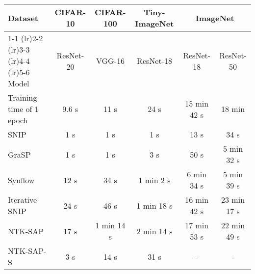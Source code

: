 \begin{table*}[h!]
    \begin{center}
    \caption{Pruning time of considered methods compared to time for 1 epoch of training.}     \label{tab:prune-time}
    \resizebox{1\linewidth}{!}
    {
    \begin{tabular}{ l ccccc}
    \\
    \hline
    \toprule
    Dataset &CIFAR-10&CIFAR-100&Tiny-ImageNet&\multicolumn{2}{c}{ImageNet}\\
    \cmidrule(lr){1-1} \cmidrule(lr){2-2} \cmidrule(lr){3-3} \cmidrule(lr){4-4} \cmidrule(lr){5-6}
    Model &ResNet-20&VGG-16&ResNet-18&ResNet-18&ResNet-50\\
    \midrule
    Training time of 1 epoch & 9.6 s & 11 s & 24 s & 15 min 42 s& 18 min \\
    \midrule
    SNIP & 1 s & 1 s & 1 s & 13 s &34 s \\
    GraSP & 1 s & 1 s & 3 s & 50 s & 5 min 32 s \\
    Synflow & 12 s & 34 s & 1 min 2 s & 6 min 34 s & 5 min 39 s \\
    Iterative SNIP & 24 s & 46 s & 1 min 18 s & 16 min 42 s & 23 min 17 s \\
    NTK-SAP & 17 s & 1 min 14 s & 2 min 14 s & 17 min 53 s & 22 min 49 s \\
    NTK-SAP-S & 3 s & 14 s & 31 s &-&- \\

    \bottomrule
    \end{tabular}
    
    }
    
    \end{center}

    

\end{table*}